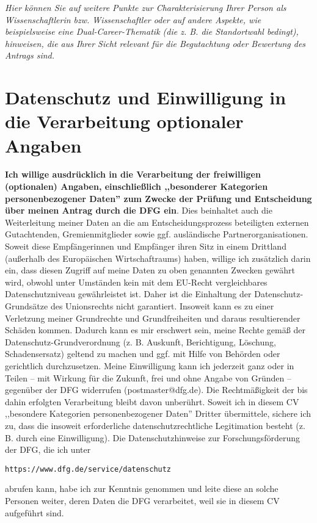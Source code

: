 \documentclass[a4paper,11pt]{article} %
\begin{document}
\emph{Hier können Sie auf weitere Punkte zur Charakterisierung Ihrer Person als Wissenschaftlerin bzw. Wissenschaftler oder auf andere Aspekte, wie beispielsweise eine Dual-Career-Thematik (die z.  B. die Standortwahl bedingt), hinweisen, die aus Ihrer Sicht relevant für die Begutachtung oder Bewertung des Antrags sind.}

\section*{Datenschutz und Einwilligung in die Verarbeitung optionaler Angaben}
\footnotesize

\noindent
\textbf{Ich willige ausdrücklich in die Verarbeitung der freiwilligen
(optionalen) Angaben, einschließlich ,,besonderer Kategorien
personenbezogener Daten'' zum Zwecke der Prüfung und Entscheidung über
meinen Antrag durch die DFG ein}.
Dies beinhaltet auch die
Weiterleitung meiner Daten an die am Entscheidungsprozess beteiligten
externen Gutachtenden, Gremienmitglieder sowie ggf. ausländische
Partnerorganisationen. Soweit diese Empfängerinnen und Empfänger ihren
Sitz in einem Drittland (außerhalb des Europäischen Wirtschaftraums)
haben, willige ich zusätzlich darin ein, dass diesen Zugriff auf meine
Daten zu oben genannten Zwecken gewährt wird, obwohl unter Umständen
kein mit dem EU-Recht vergleichbares Datenschutzniveau gewährleistet
ist. Daher ist die Einhaltung der Datenschutz-Grundsätze des
Unionsrechts nicht garantiert. Insoweit kann es zu einer Verletzung
meiner Grundrechte und Grundfreiheiten und daraus resultierender
Schäden kommen. Dadurch kann es mir erschwert sein, meine Rechte gemäß
der Datenschutz-Grundverordnung (z. B. Auskunft, Berichtigung,
Löschung, Schadensersatz) geltend zu machen und ggf. mit Hilfe von
Behörden oder gerichtlich durchzusetzen.
%
Meine Einwilligung kann ich jederzeit ganz oder in Teilen -- mit
Wirkung für die Zukunft, frei und ohne Angabe von Gründen -- gegenüber
der DFG widerrufen (postmaster@dfg.de). Die Rechtmäßigkeit der bis
dahin erfolgten Verarbeitung bleibt davon unberührt. Soweit ich in
diesem CV ,,besondere Kategorien personenbezogener Daten'' Dritter
übermittele, sichere ich zu, dass die insoweit erforderliche
datenschutzrechtliche Legitimation besteht (z. B. durch eine
Einwilligung).
Die Datenschutzhinweise zur Forschungsförderung der DFG, die ich unter
\begin{verbatim}
https://www.dfg.de/service/datenschutz
\end{verbatim}
abrufen kann, habe ich
zur Kenntnis genommen und leite diese an solche Personen weiter, deren
Daten die DFG verarbeitet, weil sie in diesem CV aufgeführt sind.
\end{document}
